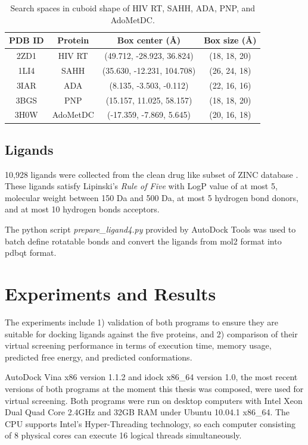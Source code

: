 \begin{table}
\centering
\begin{tabular*}
{\textwidth}
{@{\extracolsep{\fill}}cccc}
\toprule
PDB ID & Protein & Box center (\AA) & Box size (\AA) \\
\midrule
2ZD1 & HIV RT      & (49.712, -28.923, 36.824)  & (18, 18, 20) \\
1LI4   & SAHH       & (35.630, -12.231, 104.708) & (26, 24, 18) \\
3IAR  & ADA          & (8.135, -3.503, -0.112)      & (22, 16, 16) \\
3BGS & PNP           & (15.157, 11.025, 58.157)   & (18, 18, 20) \\
3H0W & AdoMetDC & (-17.359, -7.869, 5.645)    & (20, 16, 18) \\
\bottomrule
\end{tabular*}
\caption{Search spaces in cuboid shape of HIV RT, SAHH, ADA, PNP, and AdoMetDC.}
\label{tab:DockingSearchSpaces}
\end{table}

\subsection{Ligands}

10,928 ligands were collected from the clean drug like subset of ZINC database \citep{532-2005}. These ligands satisfy Lipinski's \textit{Rule of Five} \citep{169-1997,167-2000,168-2004} with LogP value of at most 5, molecular weight between 150 Da and 500 Da, at most 5 hydrogen bond donors, and at most 10 hydrogen bonds acceptors.

The python script \textit{prepare\_ligand4.py} provided by AutoDock Tools \citep{785-1999,596-2009} was used to batch define rotatable bonds and convert the ligands from mol2 format into pdbqt format.

\section{Experiments and Results}

The experiments include 1) validation of both programs to ensure they are suitable for docking ligands against the five proteins, and 2) comparison of their virtual screening performance in terms of execution time, memory usage, predicted free energy, and predicted conformations.

AutoDock Vina \citep{595-2010} x86 version 1.1.2 and idock x86\_64 version 1.0, the most recent versions of both programs at the moment this thesis was composed, were used for virtual screening. Both programs were run on desktop computers with Intel Xeon Dual Quad Core 2.4GHz and 32GB RAM under Ubuntu 10.04.1 x86\_64. The CPU supports Intel's Hyper-Threading technology, so each computer consisting of 8 physical cores can execute 16 logical threads simultaneously.

